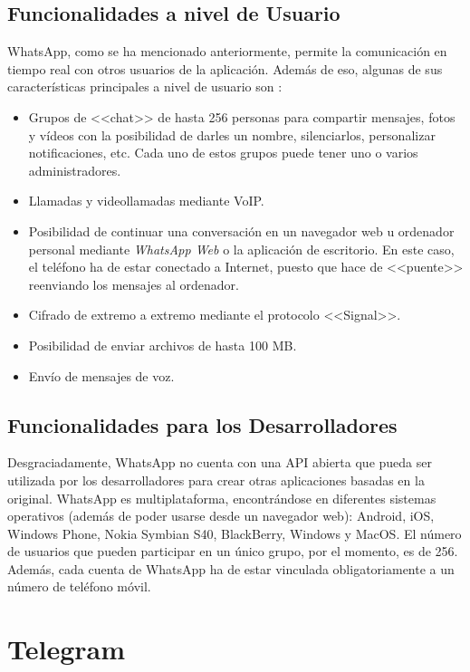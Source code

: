 \subsection{Funcionalidades a nivel de Usuario}
WhatsApp, como se ha mencionado anteriormente, permite la comunicación en tiempo real con otros usuarios de la aplicación. Además de eso, algunas de sus características principales a nivel de usuario son \cite{WhatsApp2017}:

\begin{itemize}
	\item Grupos de <<chat>> de hasta 256 personas para compartir mensajes, fotos y vídeos con la posibilidad de darles un nombre, silenciarlos, personalizar notificaciones, etc. Cada uno de estos grupos puede tener uno o varios administradores.
	\item Llamadas y videollamadas mediante \acf{VoIP}.
	\item Posibilidad de continuar una conversación en un navegador web u ordenador personal mediante \textit{WhatsApp Web} o la aplicación de escritorio. En este caso, el teléfono ha de estar conectado a Internet, puesto que hace de <<puente>> reenviando los mensajes al ordenador.
	\item Cifrado de extremo a extremo mediante el protocolo <<Signal>>.
	\item Posibilidad de enviar archivos de hasta 100 \acf{MB}.
	\item Envío de mensajes de voz.
\end{itemize}


\subsection{Funcionalidades para los Desarrolladores}
Desgraciadamente, WhatsApp no cuenta con una \acs{API} abierta que pueda ser utilizada por los desarrolladores para crear otras aplicaciones basadas en la original. WhatsApp es multiplataforma, encontrándose en diferentes sistemas operativos (además de poder usarse desde un navegador web): Android, iOS, Windows Phone, Nokia Symbian S40, BlackBerry, Windows y MacOS. El número de usuarios que pueden participar en un único grupo, por el momento, es de 256. Además, cada cuenta de WhatsApp ha de estar vinculada obligatoriamente a un número de teléfono móvil.

\newpage

\section{Telegram}
\label{sec:telegram}

